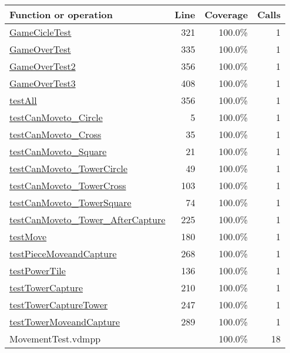 \begin{longtable}{|l|r|r|r|}
\hline
Function or operation & Line & Coverage & Calls \\
\hline
\hline
\hyperref[GameCicleTest:321]{GameCicleTest} & 321&100.0\% & 1 \\
\hline
\hyperref[GameOverTest:335]{GameOverTest} & 335&100.0\% & 1 \\
\hline
\hyperref[GameOverTest2:356]{GameOverTest2} & 356&100.0\% & 1 \\
\hline
\hyperref[GameOverTest3:408]{GameOverTest3} & 408&100.0\% & 1 \\
\hline
\hyperref[testAll:356]{testAll} & 356&100.0\% & 1 \\
\hline
\hyperref[testCanMoveto:Circle:5]{testCanMoveto\_Circle} & 5&100.0\% & 1 \\
\hline
\hyperref[testCanMoveto:Cross:35]{testCanMoveto\_Cross} & 35&100.0\% & 1 \\
\hline
\hyperref[testCanMoveto:Square:21]{testCanMoveto\_Square} & 21&100.0\% & 1 \\
\hline
\hyperref[testCanMoveto:TowerCircle:49]{testCanMoveto\_TowerCircle} & 49&100.0\% & 1 \\
\hline
\hyperref[testCanMoveto:TowerCross:103]{testCanMoveto\_TowerCross} & 103&100.0\% & 1 \\
\hline
\hyperref[testCanMoveto:TowerSquare:74]{testCanMoveto\_TowerSquare} & 74&100.0\% & 1 \\
\hline
\hyperref[testCanMoveto:Tower:AfterCapture:225]{testCanMoveto\_Tower\_AfterCapture} & 225&100.0\% & 1 \\
\hline
\hyperref[testMove:180]{testMove} & 180&100.0\% & 1 \\
\hline
\hyperref[testPieceMoveandCapture:268]{testPieceMoveandCapture} & 268&100.0\% & 1 \\
\hline
\hyperref[testPowerTile:136]{testPowerTile} & 136&100.0\% & 1 \\
\hline
\hyperref[testTowerCapture:210]{testTowerCapture} & 210&100.0\% & 1 \\
\hline
\hyperref[testTowerCaptureTower:247]{testTowerCaptureTower} & 247&100.0\% & 1 \\
\hline
\hyperref[testTowerMoveandCapture:289]{testTowerMoveandCapture} & 289&100.0\% & 1 \\
\hline
\hline
MovementTest.vdmpp & & 100.0\% & 18 \\
\hline
\end{longtable}

